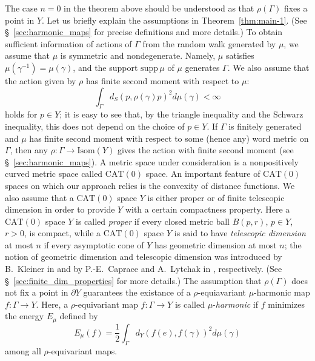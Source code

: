 \documentclass[12pt]{amsart}
\numberwithin{equation}{section}
\theoremstyle{plain}
\theoremstyle{definition}
\theoremstyle{remark}
\newcommand{\ene}[1]{E_{#1}}
\newcommand{\isom}[1]{\mathrm{Isom}({#1})}
\newcommand{\cat}[1]{\mathrm{CAT}(#1)}
\newcommand{\supp}{\mathrm{supp}\,}
\begin{document}
The case $n=0$ in the theorem above should be understood as that
$\rho(\Gamma)$ fixes a point in $Y$. 
Let us briefly explain the assumptions in Theorem~\ref{thm:main-1}. 
(See \S~\ref{sec:harmonic_maps} for precise definitions and more
details.)
To obtain sufficient information of actions of $\Gamma$ from the
random walk generated by $\mu$, we assume that 
$\mu$ is symmetric and nondegenerate.
Namely, $\mu$ satisfies $\mu(\gamma^{-1})=\mu(\gamma)$, and the support
$\supp{\mu}$ of $\mu$ generates $\Gamma$. 
We also assume that the action given by $\rho$ has finite second
moment with respect to $\mu$:
\begin{equation*}
 \int_{\Gamma} d_S(p,\rho(\gamma)p)^2 d\mu(\gamma)< \infty
\end{equation*}
holds for $p \in Y$; 
it is easy to see that, by the triangle inequality
and the Schwarz inequality, this does not depend on the choice of 
$p \in Y$.  If $\Gamma$ is finitely generated and $\mu$ has finite
second moment with respect to some (hence any) word metric on $\Gamma$,
then any $\rho \colon \Gamma \rightarrow \isom{Y}$ gives the action with
finite second moment (see \S~\ref{sec:harmonic_maps}). 
A metric space under consideration is a nonpositively curved metric
space called $\cat{0}$ space. 
An important feature of $\cat{0}$ spaces on which our approach relies
is the convexity of distance functions. 
We also assume that a $\cat{0}$ space $Y$ is either proper or of finite
telescopic dimension in order to provide $Y$ with a certain compactness
property. 
Here a $\cat{0}$ space $Y$ is called {\it proper} if every closed metric
ball $B(p,r)$, $p\in Y$, $r>0$, is compact, while a $\cat{0}$ space $Y$
is said to have {\it telescopic dimension} at most $n$
if every asymptotic cone of $Y$ has geometric dimension at most $n$; 
the notion of geometric dimension and telescopic dimension was 
introduced by B.~Kleiner in \cite{kleiner} and by
P.-E.~Caprace and A.~Lytchak in \cite{caprace1}, respectively. 
(See \S~\ref{sec:finite_dim_properties} for more details.)
The assumption that $\rho(\Gamma)$ does not fix a point in $\partial Y$
guarantees the existance of a $\rho$-equiavariant $\mu$-harmonic map 
$f \colon \Gamma \rightarrow Y$. 
Here, a $\rho$-equivariant map $f\colon \Gamma \rightarrow Y$ is called 
$\mu$-{\it harmonic} if $f$ minimizes the energy $\ene{\mu}$ defined by
\begin{equation*}
 \ene{\mu}(f)=
 \frac{1}{2} \int_{\Gamma} d_Y(f(e),f(\gamma))^2 d\mu(\gamma)
\end{equation*}
among all $\rho$-equivariant maps. 
\end{document}
